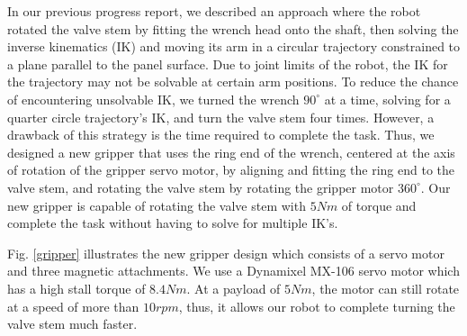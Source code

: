 \documentclass{standalone}
\begin{document}
In our previous progress report, we described an approach where the robot rotated the valve stem by fitting the wrench head onto the shaft, then solving the inverse kinematics (IK) and moving its arm in a circular trajectory constrained to a plane parallel to the panel surface.
Due to joint limits of the robot, the IK for the trajectory may
not be solvable at certain arm positions. To reduce the chance of encountering unsolvable IK, we turned the wrench $90^{\circ}$ at a time, solving for a quarter circle trajectory's IK, and turn the valve stem four times. However, a drawback of this strategy is the time required to
complete the task. Thus, we designed a new gripper that uses the ring
end of the wrench, centered at the axis of rotation of the gripper servo
motor, by aligning and fitting the ring end to the valve
stem, and rotating the valve stem by rotating the gripper motor
$360^{\circ}$. Our new gripper is capable of rotating the valve 
stem with $5Nm$ of torque and complete the task without having
to solve for multiple IK's.

Fig. \ref{gripper} illustrates the new gripper design which consists of a
servo motor and three magnetic attachments. We use a Dynamixel MX-106
servo motor which has a high stall torque of $8.4Nm$. At a payload of 
$5Nm$, the motor can still rotate at a speed of
more than $10 rpm$, thus, it allows our robot to complete turning 
the valve stem much faster.


\end{document}
